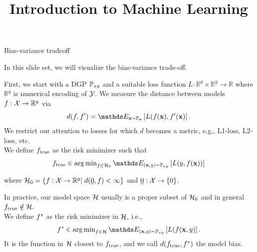 \documentclass[11pt,compress,t,notes=noshow, xcolor=table]{beamer}
\title{Introduction to Machine Learning}
\date{}
\begin{document}


\begin{vbframe}{Bias-variance tradeoff}

In this slide set, we will visualize the bias-variance trade-off. \\
\lz 

First, we start with a DGP $\mathbb{P}_{xy}$ and a suitable loss function $L:\mathbb{R}^g\times\mathbb{R}^g\rightarrow\mathbb{R}$ where $\mathbb{R}^g$ is numerical encoding of $\mathcal{Y}$. We measure the distance between models $f:\mathcal{X}\rightarrow\mathbb{R}^g$ via $$d(f, f^\prime) = \E_{\xv\sim\mathbb{P}_{\xv}}\left[L(f(\xv), f^\prime(\xv)\right].$$
We restrict our attention to losses for which $d$ becomes a metric, e.g., L1-loss, L2-loss, etc. \\
\lz
We define $f_{\text{true}}$ as the risk minimizer such that $$\ftrue \in \argmin_{f \in \Hspace_0} \E_{\xy \sim \Pxy}\left[L(y, f(\xv))\right]$$

where $\mathcal{H}_0 = \left\{f:\mathcal{X}\rightarrow\mathbb{R}^g\vert\; d(\underline{0}, f) < \infty \right\}$ and $\underline{0}:\mathcal{X}\rightarrow\{0\}$.

\framebreak

In practice, our model space $\mathcal{H}$ usually is a proper subset of $\mathcal{H}_0$ and in general $f_{\text{true}} \notin \mathcal{H}.$\\
We define $f^{\ast}$ as the risk minimizer in $\mathcal{H},$ i.e.,
$$\fbayes \in \argmin_{f \in \Hspace} \E_{\xy \sim \Pxy}\left[L(f(\xv, y)\right].$$
It is the function in $\mathcal{H}$ closest to $f_{\text{true}}$, and we call $d(f_{\text{true}}, f^{\ast})$ the model bias.


\end{vbframe}
\end{document}
